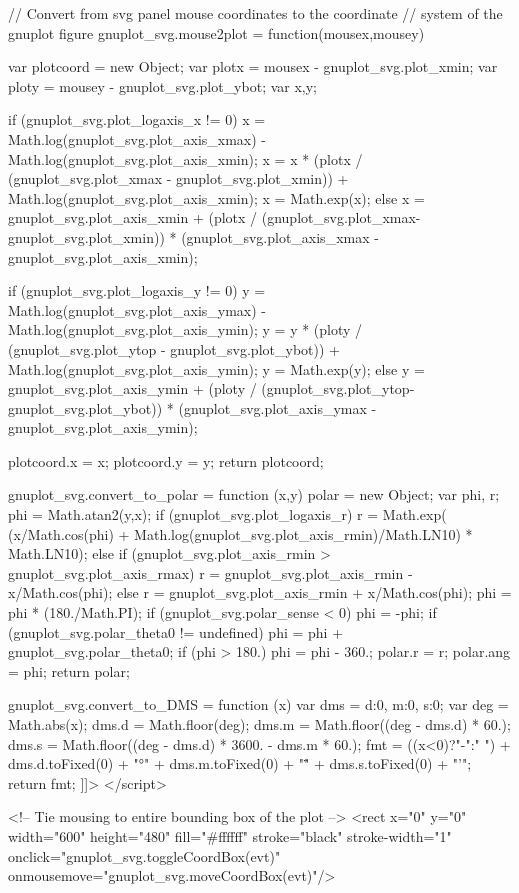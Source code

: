 // Convert from svg panel mouse coordinates to the coordinate
// system of the gnuplot figure
gnuplot_svg.mouse2plot = function(mousex,mousey) {
    var plotcoord = new Object;
    var plotx = mousex - gnuplot_svg.plot_xmin;
    var ploty = mousey - gnuplot_svg.plot_ybot;
    var x,y;

    if (gnuplot_svg.plot_logaxis_x != 0) {
	x = Math.log(gnuplot_svg.plot_axis_xmax)
	  - Math.log(gnuplot_svg.plot_axis_xmin);
	x = x * (plotx / (gnuplot_svg.plot_xmax - gnuplot_svg.plot_xmin))
	  + Math.log(gnuplot_svg.plot_axis_xmin);
	x = Math.exp(x);
    } else {
	x = gnuplot_svg.plot_axis_xmin + (plotx / (gnuplot_svg.plot_xmax-gnuplot_svg.plot_xmin)) * (gnuplot_svg.plot_axis_xmax - gnuplot_svg.plot_axis_xmin);
    }

    if (gnuplot_svg.plot_logaxis_y != 0) {
	y = Math.log(gnuplot_svg.plot_axis_ymax)
	  - Math.log(gnuplot_svg.plot_axis_ymin);
	y = y * (ploty / (gnuplot_svg.plot_ytop - gnuplot_svg.plot_ybot))
	  + Math.log(gnuplot_svg.plot_axis_ymin);
	y = Math.exp(y);
    } else {
	y = gnuplot_svg.plot_axis_ymin + (ploty / (gnuplot_svg.plot_ytop-gnuplot_svg.plot_ybot)) * (gnuplot_svg.plot_axis_ymax - gnuplot_svg.plot_axis_ymin);
    }

    plotcoord.x = x;
    plotcoord.y = y;
    return plotcoord;
}

gnuplot_svg.convert_to_polar = function (x,y)
{
    polar = new Object;
    var phi, r;
    phi = Math.atan2(y,x);
    if (gnuplot_svg.plot_logaxis_r) 
        r = Math.exp( (x/Math.cos(phi) + Math.log(gnuplot_svg.plot_axis_rmin)/Math.LN10) * Math.LN10);
    else if (gnuplot_svg.plot_axis_rmin > gnuplot_svg.plot_axis_rmax)
        r = gnuplot_svg.plot_axis_rmin - x/Math.cos(phi);
    else
        r = gnuplot_svg.plot_axis_rmin + x/Math.cos(phi);
    phi = phi * (180./Math.PI);
    if (gnuplot_svg.polar_sense < 0)
	phi = -phi;
    if (gnuplot_svg.polar_theta0 != undefined)
	phi = phi + gnuplot_svg.polar_theta0;
    if (phi > 180.)
	phi = phi - 360.;
    polar.r = r;
    polar.ang = phi;
    return polar;
}

gnuplot_svg.convert_to_DMS = function (x)
{
    var dms = {d:0, m:0, s:0};
    var deg = Math.abs(x);
    dms.d = Math.floor(deg);
    dms.m = Math.floor((deg - dms.d) * 60.);
    dms.s = Math.floor((deg - dms.d) * 3600. - dms.m * 60.);
    fmt = ((x<0)?"-":" ")
        + dms.d.toFixed(0) + "°"
	+ dms.m.toFixed(0) + "\""
	+ dms.s.toFixed(0) + "'";
    return fmt;
}
]]>
</script>

<!-- Tie mousing to entire bounding box of the plot -->
<rect x="0" y="0" width="600" height="480" fill="#ffffff" stroke="black" stroke-width="1"
onclick="gnuplot_svg.toggleCoordBox(evt)"  onmousemove="gnuplot_svg.moveCoordBox(evt)"/>

